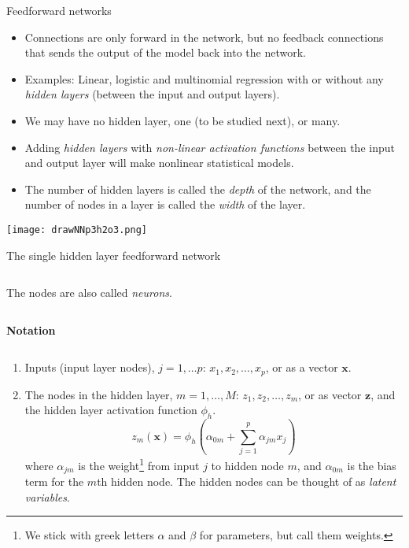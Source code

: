 \documentclass[10pt,ignorenonframetext,]{beamer}
\providecommand{\tightlist}{%
  \setlength{\itemsep}{0pt}\setlength{\parskip}{0pt}}
\begin{document}
\begin{frame}{Feedforward networks}
\protect\hypertarget{feedforward-networks}{}

\begin{itemize}
\item
  Connections are only forward in the network, but no feedback
  connections that sends the output of the model back into the network.
\item
  Examples: Linear, logistic and multinomial regression with or without
  any \emph{hidden layers} (between the input and output layers).
\item
  We may have no hidden layer, one (to be studied next), or many.
\item
  Adding \emph{hidden layers} with \emph{non-linear activation
  functions} between the input and output layer will make nonlinear
  statistical models.
\item
  The number of hidden layers is called the \emph{depth} of the network,
  and the number of nodes in a layer is called the \emph{width} of the
  layer.
\end{itemize}

\end{frame}

\begin{frame}

\centering

\texttt{[image: drawNNp3h2o3.png]}

\end{frame}

\begin{frame}

\begin{block}{The single hidden layer feedforward network}

\(~\)

The nodes are also called \emph{neurons}.

\(~\)

\textbf{Notation}

\(~\)

\begin{enumerate}
\tightlist
\item
  Inputs (input layer nodes), \(j=1,\dots p\):
  \(x_1, x_2, \ldots, x_p\), or as a vector \({\boldsymbol x}\).
\item
  The nodes in the hidden layer, \(m=1,\ldots, M\):
  \(z_1, z_2, \ldots, z_m\), or as vector \({\boldsymbol z}\), and the
  hidden layer activation function \(\phi_h\). \[
  z_m({\boldsymbol x})=\phi_h(\alpha_{0m}+\sum_{j=1}^p \alpha_{jm}x_{j})
  \] where \(\alpha_{jm}\) is the
  weight\footnote{We stick with greek letters $\alpha$ and $\beta$ for parameters, but call them weights.}
  from input \(j\) to hidden node \(m\), and \(\alpha_{0m}\) is the bias
  term for the \(m\)th hidden node. The hidden nodes can be thought of
  as \emph{latent variables}.
\end{enumerate}

\end{block}

\end{frame}
\end{document}
